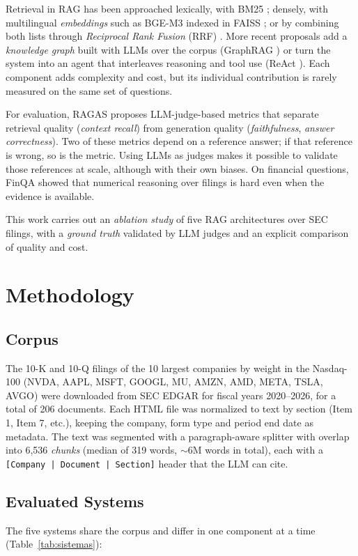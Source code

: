 \documentclass[conference]{IEEEtran}
\begin{document}
Retrieval in RAG has been approached lexically, with BM25 \cite{robertson2009bm25}; densely, with multilingual \textit{embeddings} such as BGE-M3 \cite{chen2024bgem3} indexed in FAISS \cite{johnson2019faiss}; or by combining both lists through \textit{Reciprocal Rank Fusion} (RRF) \cite{cormack2009rrf}. More recent proposals add a \textit{knowledge graph} built with LLMs over the corpus (GraphRAG \cite{edge2024graphrag}) or turn the system into an agent that interleaves reasoning and tool use (ReAct \cite{yao2023react}). Each component adds complexity and cost, but its individual contribution is rarely measured on the same set of questions.

For evaluation, RAGAS \cite{es2024ragas} proposes LLM-judge-based metrics that separate retrieval quality (\textit{context recall}) from generation quality (\textit{faithfulness}, \textit{answer correctness}). Two of these metrics depend on a reference answer; if that reference is wrong, so is the metric. Using LLMs as judges \cite{zheng2023judge} makes it possible to validate those references at scale, although with their own biases. On financial questions, FinQA \cite{chen2021finqa} showed that numerical reasoning over filings is hard even when the evidence is available.

This work carries out an \textit{ablation study} of five RAG architectures over SEC filings, with a \textit{ground truth} validated by LLM judges and an explicit comparison of quality and cost.

\section{Methodology}

\subsection{Corpus}
The 10-K and 10-Q filings of the 10 largest companies by weight in the Nasdaq-100 (NVDA, AAPL, MSFT, GOOGL, MU, AMZN, AMD, META, TSLA, AVGO) were downloaded from SEC EDGAR for fiscal years 2020--2026, for a total of 206 documents. Each HTML file was normalized to text by section (Item 1, Item 7, etc.), keeping the company, form type and period end date as metadata. The text was segmented with a paragraph-aware splitter with overlap into 6{,}536 \textit{chunks} (median of 319 words, $\sim$6M words in total), each with a \texttt{[Company | Document | Section]} header that the LLM can cite.

\subsection{Evaluated Systems}
The five systems share the corpus and differ in one component at a time (Table~\ref{tab:sistemas}):
\end{document}
